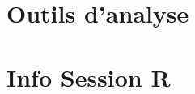 \documentclass[a4paper]{article}
\begin{document}
%

\section*{Outils d'analyse}


\section*{Info Session R}

\end{document}
